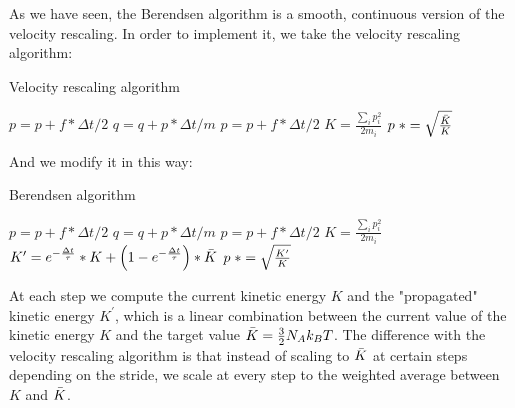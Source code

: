 

As we have seen, the Berendsen algorithm is a smooth, continuous version of the velocity rescaling. In order to implement it, we take the velocity rescaling algorithm: 

 \begin{algorithm}[H]\label{velocity_rescaling}
			\caption{Velocity rescaling algorithm}
			\begin{algorithmic}[1]
				\State $p=p+f*\Delta t/2$
				\State $q=q+p*\Delta t/m$
				\State $p=p+f*\Delta t/2$
				\State $K= \frac{\sum_{i}{p_i^2}}{{2m_i}}$
				\State $p \hspace{0.1cm}* = \sqrt{\frac{\Bar{K}}{K}}$
				\EndIf
				\EndFor
			\end{algorithmic}
		\end{algorithm}

And we modify it in this way:

 \begin{algorithm}[H]\label{berendsen}
			\caption{Berendsen algorithm}
			\begin{algorithmic}[1]
				\State $p=p+f*\Delta t/2$
				\State $q=q+p*\Delta t/m$
				\State $p=p+f*\Delta t/2$
				\State $K= \frac{\sum_{i}{p_i^2}}{{2m_i}}$
				\State $K'= e^{-\frac{\Delta t}{\tau}}*K + \left(1-e^{-\frac{\Delta t}{\tau}}\right)*\Bar{K}$
				\State $p \hspace{0.1cm}*= \sqrt{\frac{K'}{K}}$
				\EndFor
			\end{algorithmic}
		\end{algorithm}


At each step we compute the current kinetic energy $K$ and the "propagated" kinetic energy $K^\prime$, which is a linear combination between the current value of the kinetic energy $K$ and the target value $\Bar{K} = \frac{3}{2} N_A k_B T$. The difference with the velocity rescaling algorithm is that instead of scaling to $\Bar{K}$ at certain steps depending on the stride,  we scale at every step to the weighted average between $K$ and $\Bar{K}$.

